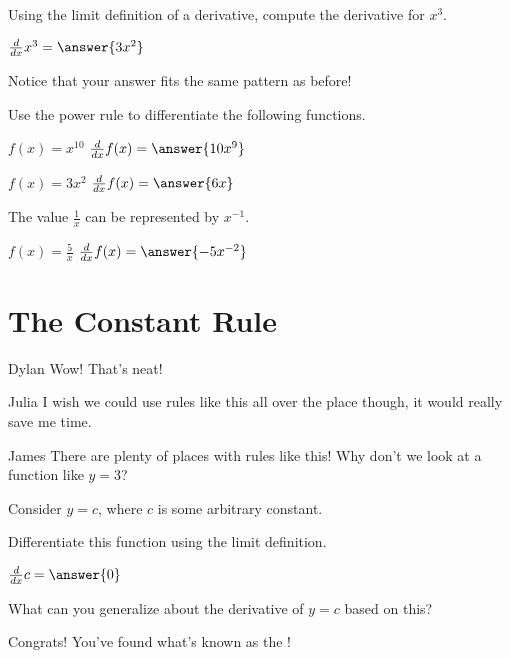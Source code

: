 \documentclass{ximera}
\begin{document}
\begin{question}
Using the limit definition of a derivative, compute the derivative for $x^3$.

$\frac{d}{dx} x^3 =  \answer{3x^2}$
\begin{feedback}[correct]
Notice that your answer fits the same pattern as before!
\end{feedback}
\end{question}

\begin{question}
Use the power rule to differentiate the following functions.

$f(x) = x^{10}$ \hspace{11mm} $\ddx f(x) = \answer{10x^9}$

$f(x) = 3x^2$ \hspace{10mm} $\ddx f(x) = \answer{6x}$

\begin{hint}
The value $\frac{1}{x}$ can be represented by $x^{-1}$.
\end{hint}
$f(x) = \frac{5}{x}$ \hspace{12mm} $\frac{d}{dx}f(x) = \answer{-5x^{-2}}$
\end{question}

\section{The Constant Rule}
\begin{dialogue}
\item[Dylan] Wow! That's neat!
\item[Julia] I wish we could use rules like this all over the place though, it would really save me time.
\item[James] There are plenty of places with rules like this! Why don't we look at a function like $y = 3$?
\end{dialogue}

Consider $y = c$, where $c$ is some arbitrary constant.
\begin{question}
\item{Differentiate this function using the limit definition.}

$ \frac{d}{dx} c =  \answer{0}$

What can you generalize about the derivative of $y=c$ based on this?
\begin{multipleChoice}
\end{multipleChoice}
\begin{feedback}[correct]
Congrats! You've found what's known as the !
\end{feedback}
\end{question}
\end{document}
